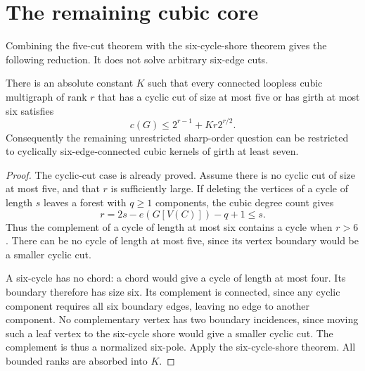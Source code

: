 \section{The remaining cubic core}
\label{sec:remaining-cubic-core}

Combining the five-cut theorem with the six-cycle-shore theorem gives the following reduction.
It does not solve arbitrary six-edge cuts.

\begin{corollary}
There is an absolute constant $K$ such that every connected loopless cubic multigraph of rank $r$ that has a cyclic cut of size at most five or has girth at most six satisfies
\[
 c(G)\le2^{r-1}+Kr2^{r/2}.
\]
Consequently the remaining unrestricted sharp-order question can be restricted to cyclically six-edge-connected cubic kernels of girth at least seven.
\end{corollary}

\begin{proof}
The cyclic-cut case is already proved.
Assume there is no cyclic cut of size at most five, and that $r$ is sufficiently large.
If deleting the vertices of a cycle of length $s$ leaves a forest with $q\ge1$ components, the cubic degree count gives
\[
 r=2s-e(G[V(C)])-q+1\le s.
\]
Thus the complement of a cycle of length at most six contains a cycle when $r>6$.
There can be no cycle of length at most five, since its vertex boundary would be a smaller cyclic cut.

A six-cycle has no chord: a chord would give a cycle of length at most four.
Its boundary therefore has size six.
Its complement is connected, since any cyclic component requires all six boundary edges, leaving no edge to another component.
No complementary vertex has two boundary incidences, since moving such a leaf vertex to the six-cycle shore would give a smaller cyclic cut.
The complement is thus a normalized six-pole.
Apply the six-cycle-shore theorem.
All bounded ranks are absorbed into $K$.
\end{proof}
